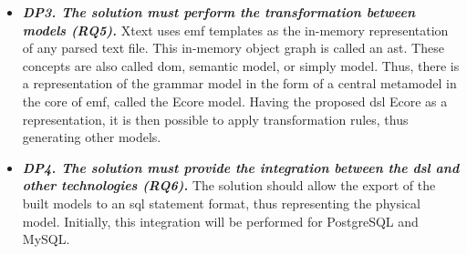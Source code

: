 \begin{itemize}
    \item\textit{\textbf{DP3. The solution must perform the transformation between models (RQ5).}}
    Xtext uses \ac{emf} templates as the in-memory representation of any parsed text file.
    This in-memory object graph is called an \ac{ast}.
    These concepts are also called \ac{dom}, semantic model, or simply model.
    Thus, there is a representation of the grammar model in the form of a central metamodel in the core of \ac{emf}, called the Ecore model.
    Having the proposed \ac{dsl} Ecore as a representation, it is then possible to apply transformation rules, thus generating other models.
    
    \item\textit{\textbf{DP4. The solution must provide the integration between the \ac{dsl} and other technologies (RQ6).}}
    The solution should allow the export of the built models to an \ac{sql} statement format, thus representing the physical model.
    Initially, this integration will be performed for PostgreSQL and MySQL.
    

\end{itemize}
